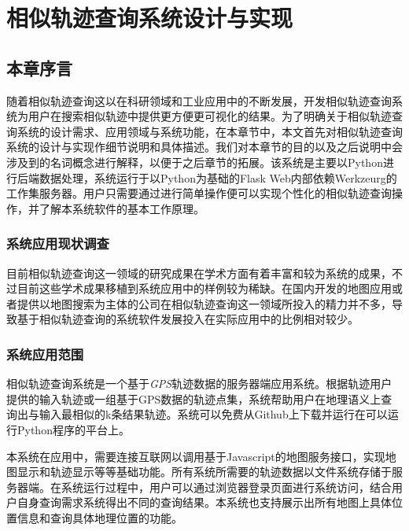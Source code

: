 
\chapter{相似轨迹查询系统设计与实现}
\label{chap:system requirement specification}

\section{本章序言}
\label{sec:introduction}
随着相似轨迹查询这以在科研领域和工业应用中的不断发展，开发相似轨迹查询系统为用户在搜索相似轨迹中提供更方便更可视化的结果。为了明确关于相似轨迹查询系统的设计需求、应用领域与系统功能，在本章节中，本文首先对相似轨迹查询系统的设计与实现作细节说明和具体描述。我们对本章节的目的以及之后说明中会涉及到的名词概念进行解释，以便于之后章节的拓展。该系统是主要以Python进行后端数据处理，系统运行于以Python为基础的Flask Web内部依赖Werkzeurg的工作集服务器。用户只需要通过进行简单操作便可以实现个性化的相似轨迹查询操作，并了解本系统软件的基本工作原理。

\subsection{系统应用现状调查}
\label{subsec:application situation}
目前相似轨迹查询这一领域的研究成果在学术方面有着丰富和较为系统的成果，不过目前这些学术成果移植到系统应用中的样例较为稀缺。在国内开发的地图应用或者提供以地图搜索为主体的公司在相似轨迹查询这一领域所投入的精力并不多，导致基于相似轨迹查询的系统软件发展投入在实际应用中的比例相对较少。

\subsection{系统应用范围}
\label{subsec:scope}
相似轨迹查询系统是一个基于\emph{GPS}轨迹数据的服务器端应用系统。根据轨迹用户提供的输入轨迹或一组基于GPS数据的轨迹点集，系统帮助用户在地理语义上查询出与输入最相似的k条结果轨迹。系统可以免费从Github上下载并运行在可以运行Python程序的平台上。

本系统在应用中，需要连接互联网以调用基于Javascript的地图服务接口，实现地图显示和轨迹显示等等基础功能。所有系统所需要的轨迹数据以文件系统存储于服务器端。在系统运行过程中，用户可以通过浏览器登录页面进行系统访问，结合用户自身查询需求系统得出不同的查询结果。本系统也支持展示出所有地图上具体位置信息和查询具体地理位置的功能。


